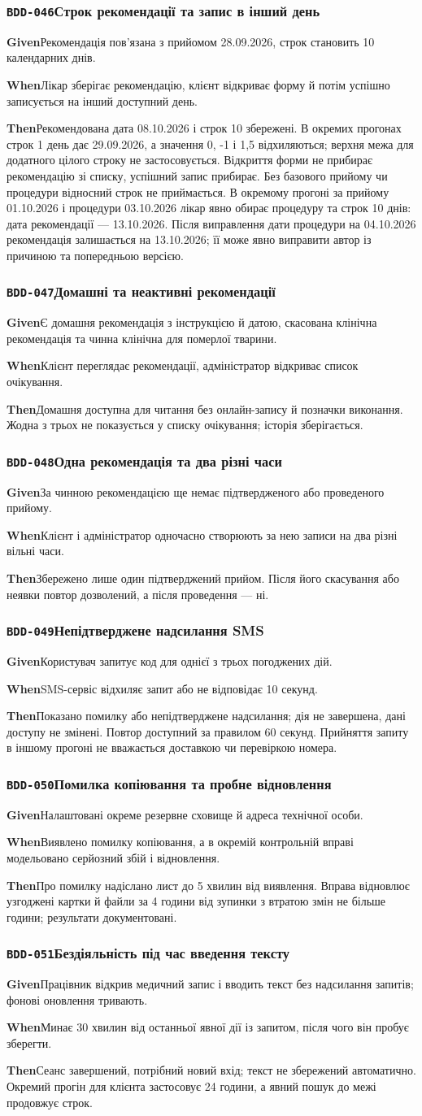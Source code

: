 \documentclass[11pt,a4paper]{article}
\newcommand{\scenario}[5]{%
  \Needspace{8\baselineskip}%
  \subsubsection*{\hypertarget{#1}{\texttt{#1}}\quad #2}%
  \textbf{Given}\quad #3\par
  \textbf{When}\quad #4\par
  \textbf{Then}\quad #5\par\medskip}
\begin{document}
\scenario{BDD-046}{Строк рекомендації та запис в інший день}{Рекомендація пов’язана з прийомом 28.09.2026, строк становить 10 календарних днів.}{Лікар зберігає рекомендацію, клієнт відкриває форму й потім успішно записується на інший доступний день.}{Рекомендована дата 08.10.2026 і строк 10 збережені. В окремих прогонах строк 1 день дає 29.09.2026, а значення 0, -1 і 1,5 відхиляються; верхня межа для додатного цілого строку не застосовується. Відкриття форми не прибирає рекомендацію зі списку, успішний запис прибирає. Без базового прийому чи процедури відносний строк не приймається. В окремому прогоні за прийому 01.10.2026 і процедури 03.10.2026 лікар явно обирає процедуру та строк 10 днів: дата рекомендації — 13.10.2026. Після виправлення дати процедури на 04.10.2026 рекомендація залишається на 13.10.2026; її може явно виправити автор із причиною та попередньою версією.}

\scenario{BDD-047}{Домашні та неактивні рекомендації}{Є домашня рекомендація з інструкцією й датою, скасована клінічна рекомендація та чинна клінічна для померлої тварини.}{Клієнт переглядає рекомендації, адміністратор відкриває список очікування.}{Домашня доступна для читання без онлайн-запису й позначки виконання. Жодна з трьох не показується у списку очікування; історія зберігається.}

\scenario{BDD-048}{Одна рекомендація та два різні часи}{За чинною рекомендацією ще немає підтвердженого або проведеного прийому.}{Клієнт і адміністратор одночасно створюють за нею записи на два різні вільні часи.}{Збережено лише один підтверджений прийом. Після його скасування або неявки повтор дозволений, а після проведення — ні.}

\scenario{BDD-049}{Непідтверджене надсилання SMS}{Користувач запитує код для однієї з трьох погоджених дій.}{SMS-сервіс відхиляє запит або не відповідає 10 секунд.}{Показано помилку або непідтверджене надсилання; дія не завершена, дані доступу не змінені. Повтор доступний за правилом 60 секунд. Прийняття запиту в іншому прогоні не вважається доставкою чи перевіркою номера.}

\scenario{BDD-050}{Помилка копіювання та пробне відновлення}{Налаштовані окреме резервне сховище й адреса технічної особи.}{Виявлено помилку копіювання, а в окремій контрольній вправі модельовано серйозний збій і відновлення.}{Про помилку надіслано лист до 5 хвилин від виявлення. Вправа відновлює узгоджені картки й файли за 4 години від зупинки з втратою змін не більше години; результати документовані.}

\scenario{BDD-051}{Бездіяльність під час введення тексту}{Працівник відкрив медичний запис і вводить текст без надсилання запитів; фонові оновлення тривають.}{Минає 30 хвилин від останньої явної дії із запитом, після чого він пробує зберегти.}{Сеанс завершений, потрібний новий вхід; текст не збережений автоматично. Окремий прогін для клієнта застосовує 24 години, а явний пошук до межі продовжує строк.}
\end{document}
